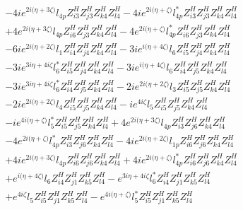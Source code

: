\begin{align}
 &-4 i e^{2 i \Big(\eta +3 \zeta \Big)} l_{4p} Z_{{i 3}}^{H} Z_{{j 3}}^{H} Z_{{k 4}}^{H} Z_{{l 4}}^{H} -4 i e^{2 i \Big(\eta +\zeta \Big)} l_{4p}^* Z_{{i 3}}^{H} Z_{{j 3}}^{H} Z_{{k 4}}^{H} Z_{{l 4}}^{H} \nonumber \\ 
 &+4 e^{2 i \Big(\eta +3 \zeta \Big)} l_{4p} Z_{{i 6}}^{H} Z_{{j 3}}^{H} Z_{{k 4}}^{H} Z_{{l 4}}^{H} -4 e^{2 i \Big(\eta +\zeta \Big)} l_{4p}^* Z_{{i 6}}^{H} Z_{{j 3}}^{H} Z_{{k 4}}^{H} Z_{{l 4}}^{H} \nonumber \\ 
 &-6 i e^{2 i \Big(\eta +2 \zeta \Big)} l_1 Z_{{i 4}}^{H} Z_{{j 4}}^{H} Z_{{k 4}}^{H} Z_{{l 4}}^{H} -3 i e^{i \Big(\eta +4 \zeta \Big)} l_6 Z_{{i 5}}^{H} Z_{{j 4}}^{H} Z_{{k 4}}^{H} Z_{{l 4}}^{H} \nonumber \\ 
 &-3 i e^{3 i \eta +4 i \zeta } l_6^* Z_{{i 5}}^{H} Z_{{j 4}}^{H} Z_{{k 4}}^{H} Z_{{l 4}}^{H} -3 i e^{i \Big(\eta +4 \zeta \Big)} l_6 Z_{{i 4}}^{H} Z_{{j 5}}^{H} Z_{{k 4}}^{H} Z_{{l 4}}^{H} \nonumber \\ 
 &-3 i e^{3 i \eta +4 i \zeta } l_6^* Z_{{i 4}}^{H} Z_{{j 5}}^{H} Z_{{k 4}}^{H} Z_{{l 4}}^{H} -2 i e^{2 i \Big(\eta +2 \zeta \Big)} l_3 Z_{{i 5}}^{H} Z_{{j 5}}^{H} Z_{{k 4}}^{H} Z_{{l 4}}^{H} \nonumber \\ 
 &-2 i e^{2 i \Big(\eta +2 \zeta \Big)} l_4 Z_{{i 5}}^{H} Z_{{j 5}}^{H} Z_{{k 4}}^{H} Z_{{l 4}}^{H} -i e^{4 i \zeta } l_5 Z_{{i 5}}^{H} Z_{{j 5}}^{H} Z_{{k 4}}^{H} Z_{{l 4}}^{H} \nonumber \\ 
 &-i e^{4 i \Big(\eta +\zeta \Big)} l_5^* Z_{{i 5}}^{H} Z_{{j 5}}^{H} Z_{{k 4}}^{H} Z_{{l 4}}^{H} +4 e^{2 i \Big(\eta +3 \zeta \Big)} l_{4p} Z_{{i 3}}^{H} Z_{{j 6}}^{H} Z_{{k 4}}^{H} Z_{{l 4}}^{H} \nonumber \\ 
 &-4 e^{2 i \Big(\eta +\zeta \Big)} l_{4p}^* Z_{{i 3}}^{H} Z_{{j 6}}^{H} Z_{{k 4}}^{H} Z_{{l 4}}^{H} -4 i e^{2 i \Big(\eta +2 \zeta \Big)} l_{1p} Z_{{i 6}}^{H} Z_{{j 6}}^{H} Z_{{k 4}}^{H} Z_{{l 4}}^{H} \nonumber \\ 
 &+4 i e^{2 i \Big(\eta +3 \zeta \Big)} l_{4p} Z_{{i 6}}^{H} Z_{{j 6}}^{H} Z_{{k 4}}^{H} Z_{{l 4}}^{H} +4 i e^{2 i \Big(\eta +\zeta \Big)} l_{4p}^* Z_{{i 6}}^{H} Z_{{j 6}}^{H} Z_{{k 4}}^{H} Z_{{l 4}}^{H} \nonumber \\ 
 &+e^{i \Big(\eta +4 \zeta \Big)} l_6 Z_{{i 4}}^{H} Z_{{j 1}}^{H} Z_{{k 5}}^{H} Z_{{l 4}}^{H} - e^{3 i \eta +4 i \zeta } l_6^* Z_{{i 4}}^{H} Z_{{j 1}}^{H} Z_{{k 5}}^{H} Z_{{l 4}}^{H} \nonumber \\ 
 &+e^{4 i \zeta } l_5 Z_{{i 5}}^{H} Z_{{j 1}}^{H} Z_{{k 5}}^{H} Z_{{l 4}}^{H} - e^{4 i \Big(\eta +\zeta \Big)} l_5^* Z_{{i 5}}^{H} Z_{{j 1}}^{H} Z_{{k 5}}^{H} Z_{{l 4}}^{H} \nonumber \\ 

\end{align}
